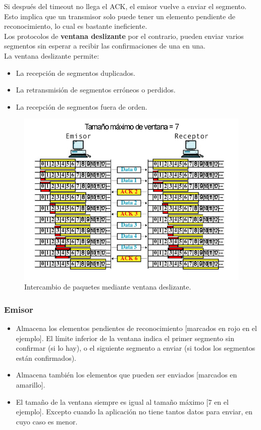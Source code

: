 Si después del timeout no llega el ACK, el emisor vuelve a enviar el segmento. Esto implica que un transmisor solo puede tener un elemento pendiente de reconocimiento, lo cual es bastante ineficiente.\\

Los protocolos de \textbf{ventana deslizante} por el contrario, pueden enviar varios segmentos sin esperar a recibir las confirmaciones de una en una.\\

La ventana deslizante permite:
\begin{itemize}
    \item La recepción de segmentos duplicados.
    \item La retransmisión de segmentos erróneos o perdidos.
    \item La recepción de segmentos fuera de orden.
\end{itemize}
\begin{figure}[H]
    \centering
    \includegraphics[width=\textwidth]{img/ventanasTCP.jpg}
    \caption{Intercambio de paquetes mediante ventana deslizante.}
\end{figure}
\subsubsection{Emisor}
\begin{itemize}
    \item Almacena los elementos pendientes de reconocimiento [marcados en rojo en el ejemplo]. El límite inferior de la ventana indica el primer segmento sin confirmar (si lo hay), o el siguiente segmento a enviar (si todos los segmentos están confirmados).
    \item Almacena también los elementos que pueden ser enviados [marcados en amarillo].
    \item El tamaño de la ventana siempre es igual al tamaño máximo [7 en el ejemplo]. Excepto cuando la aplicación no tiene tantos datos para enviar, en cuyo caso es menor.
\end{itemize}
